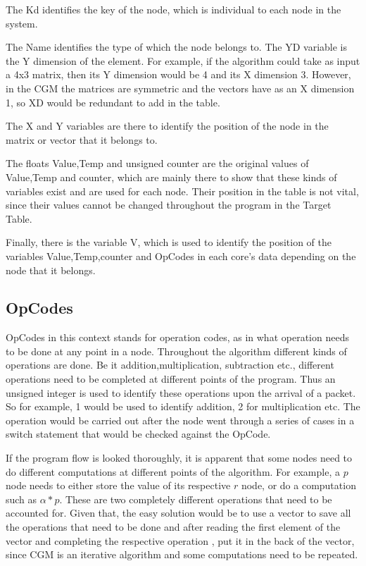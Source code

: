 \documentclass[12pt,twosided]{article}
\begin{document}
The Kd identifies the key of the node, which is individual to each node in the system. 

The Name identifies the type of which the node belongs to. The YD variable is the Y dimension of the element. For example, if the algorithm could take as input a 4x3 matrix, then its Y dimension would be 4 and its X dimension 3. However, in the CGM the matrices are symmetric and the vectors have as an X dimension 1, so XD would be redundant to add in the table. 

The X and Y variables are there to identify the position of the node in the matrix or vector that it belongs to. 

The floats Value,Temp and unsigned counter are the original values of Value,Temp and counter, which are mainly there to show that these kinds of variables exist and are used for each node. Their position in the table is not vital, since their values cannot be changed throughout the program in the Target Table. 

Finally, there is the variable V, which is used to identify the position of the variables Value,Temp,counter and OpCodes in each core's data depending on the node that it belongs.
\subsection{OpCodes}
OpCodes in this context stands for operation codes, as in what operation needs to be done at any point in a node. Throughout the algorithm different kinds of operations are done. Be it addition,multiplication, subtraction etc., different operations need to be completed at different points of the program. Thus an unsigned integer is used to identify these operations upon the arrival of a packet. So for example, 1 would be used to identify addition, 2 for multiplication etc. The operation would be carried out after the node went through a series of cases in a switch statement that would be checked against the OpCode.

If the program flow is looked thoroughly, it is apparent that some nodes need to do different computations at different points of the algorithm. For example, a $p$ node needs to either store the value of its respective $r$ node, or do a computation such as $\alpha *p$. These are two completely different operations that need to be accounted for. Given that, the easy solution would be to use a vector to save all the operations that need to be done and after reading the first element of the vector and completing the respective operation , put it in the back of the vector, since CGM is an iterative algorithm and some computations need to be repeated.
\end{document}
